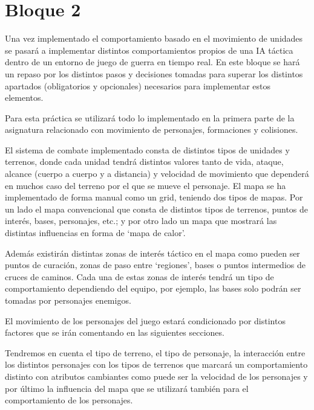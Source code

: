 \part{Bloque 2}

 Una vez implementado el comportamiento basado  en el movimiento de unidades se pasará a implementar distintos comportamientos propios de una IA táctica dentro de un entorno de juego de guerra en tiempo real.  En este bloque se hará un repaso por los distintos pasos y decisiones tomadas para superar los distintos apartados (obligatorios y opcionales) necesarios para implementar estos elementos.

Para esta práctica se utilizará todo lo implementado en la primera parte de la asignatura relacionado con movimiento de personajes, formaciones y colisiones.

El sistema de combate implementado consta de distintos tipos de unidades y terrenos, donde cada unidad tendrá distintos valores tanto de vida, ataque, alcance (cuerpo a cuerpo y a distancia) y velocidad de movimiento que dependerá en muchos caso del terreno por el que se mueve el personaje. El mapa se ha implementado de forma manual como un grid, teniendo dos tipos de mapas. Por un lado el mapa convencional que consta de distintos tipos de terrenos, puntos de interés, bases, personajes, etc.; y por otro lado un mapa que mostrará las distintas influencias en forma de `mapa de calor'.

Además  existirán distintas zonas de interés táctico en el mapa como pueden ser puntos de curación, zonas de paso entre `regiones', bases o puntos intermedios de cruces de caminos. Cada una de estas zonas de interés tendrá un tipo de comportamiento dependiendo del equipo, por ejemplo, las bases solo podrán ser tomadas por personajes enemigos.

El movimiento de los personajes del juego estará condicionado por distintos factores que se irán comentando en las siguientes secciones.

Tendremos en cuenta el tipo de terreno, el tipo de personaje, la interacción entre los distintos personajes con los tipos de terrenos que marcará un comportamiento distinto con atributos cambiantes como puede ser la velocidad de los personajes y por último la influencia del mapa que se utilizará también para el comportamiento de los personajes.
